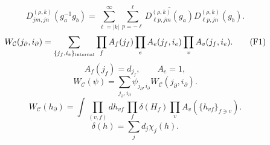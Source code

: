 \documentclass{article}
\begin{document}
\begin{equation}
D^{(\rho,k)}_{jm,jn}(g_a^{-1}g_b)=\sum_{\ell=|k|}^\infty\sum_{p=-\ell}^{\ell}\overline{D^{(\rho,k)}_{\ell p,jm}(g_a)}D^{(\rho,k)}_{\ell p,jn}(g_b).
\tag{D9}
\end{equation}
\begin{equation}
W_{\mathcal C}(j_\partial,i_\partial)=\sum_{\{j_f,i_e\}_{\rm internal}}\prod_f A_f(j_f)\prod_e A_e(j_f,i_e)\prod_vA_v(j_f,i_e).
\tag{F1}
\end{equation}
\begin{equation}
A_f(j_f)=d_{j_f},\qquad A_e=1,
\tag{F2}
\end{equation}
\begin{equation}
W_{\mathcal C}(\psi)=\sum_{j_\partial,i_\partial}\psi_{j_\partial,i_\partial}W_{\mathcal C}(j_\partial,i_\partial).
\tag{F3}
\end{equation}
\begin{equation}
W_{\mathcal C}(h_\partial)=\int\prod_{(v,f)}dh_{vf}\,\prod_f\delta(H_f)\prod_vA_v(\{h_{vf}\}_{f\ni v}).
\tag{F4}
\end{equation}
\begin{equation}
\delta(h)=\sum_jd_j\chi_j(h).
\tag{F5}
\end{equation}
\end{document}
